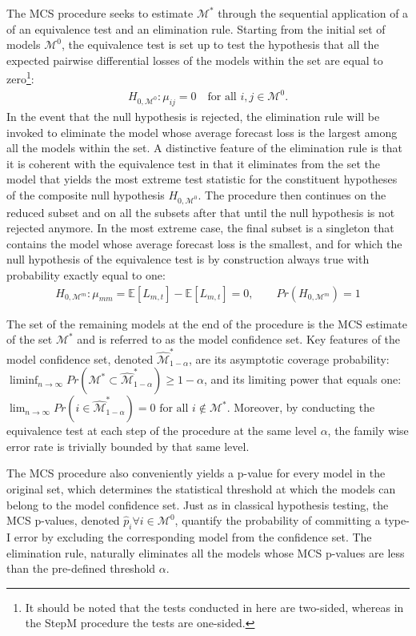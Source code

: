 \documentclass{article} %
\begin{document}
	The MCS procedure seeks to estimate $\mathcal{M}^*$ through the sequential application of a of an equivalence test and an elimination rule. Starting from the initial set of models $\mathcal{M}^0$, the equivalence test is set up to test the hypothesis that all the expected pairwise differential losses of the models within the set are equal to zero\footnote{It should be noted that the tests conducted in here are two-sided, whereas in the StepM procedure the tests are one-sided.}:
	\begin{align}
	H_{0,\mathcal{M}^0}:
	\mu_{ij}=0
	\quad \text{for all } i,j\in\mathcal{M}^0.		
	\end{align}
	In the event that the null hypothesis is rejected, the elimination rule will be invoked to eliminate the model whose average forecast loss is the largest among all the models within the set. A distinctive feature of the elimination rule is that it is coherent with the equivalence test in that it eliminates from the set the model that yields the most extreme test statistic for the constituent hypotheses of the composite null hypothesis $H_{0,\mathcal{M}^0}$. The procedure then continues on the reduced subset and on all the subsets after that until the null hypothesis is not rejected anymore. In the most extreme case, the final subset is a singleton that contains the model whose average forecast loss is the smallest, and for which the null hypothesis of the equivalence test is by construction always true with probability exactly equal to one:
	\begin{align}
		H_{0,\mathcal{M}^m}: \mu_{mm} = \mathbb{E}[L_{m,t}] - \mathbb{E}[L_{m,t}] = 0, \qquad Pr(H_{0,\mathcal{M}^m}) = 1
	\end{align}
	
	The set of the remaining models at the end of the procedure is the MCS estimate of the set $\mathcal{M}^*$ and is referred to as the model confidence set. Key features of the model confidence set, denoted $\widehat{\mathcal{M}}^*_{1-\alpha}$, are its asymptotic coverage probability: $\liminf_{n\to\infty} Pr(\mathcal{M}^* \subset \widehat{\mathcal{M}}^*_{1-\alpha}) \geq 1 - \alpha$, and its limiting power that equals one: $\lim_{n\to\infty}Pr(i \in \widehat{\mathcal{M}}^*_{1-\alpha}) = 0 \text{ for all } i \notin \mathcal{M}^*$. Moreover, by conducting the equivalence test at each step of the procedure at the same level $\alpha$, the family wise error rate is trivially bounded by that same level.
	
	The MCS procedure also conveniently yields a p-value for every model in the original set, which determines the statistical threshold at which the models can belong to the model confidence set. Just as in classical hypothesis testing, the MCS p-values, denoted $\hat{p}_i \forall i \in \mathcal{M}^0$, quantify the probability of committing a type-I error by excluding the corresponding model from the confidence set. The elimination rule, naturally eliminates all the models whose MCS p-values are less than the pre-defined threshold $\alpha$.
	
\end{document}
